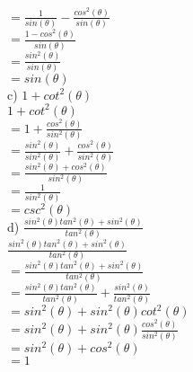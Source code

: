 \begin{enumerate}
{\tab\tab $= \frac{1}{sin(\theta)} - \frac{cos^2(\theta)}{sin(\theta)}$\\

\tab\tab $= \frac{1 - cos^2(\theta)}{sin(\theta)}$\\

\tab\tab $= \frac{sin^2(\theta)}{sin(\theta)}$\\

\tab\tab $= sin(\theta)$\\

\tab c) $1 + cot^2(\theta)$\\

\tab\tab $1 + cot^2(\theta)$\\

\tab\tab $= 1 + \frac{cos^2(\theta)}{sin^2(\theta)}$\\

\tab\tab $= \frac{sin^2(\theta)}{sin^2(\theta)} + \frac{cos^2(\theta)}{sin^2(\theta)}$\\

\tab\tab $= \frac{sin^2(\theta) + cos^2(\theta)}{sin^2(\theta)}$\\

\tab\tab $= \frac{1}{sin^2(\theta)}$\\

\tab\tab $= csc^2(\theta)$\\

\tab d) $\frac{sin^2(\theta)tan^2(\theta) + sin^2(\theta)}{tan^2(\theta)}$\\

\tab\tab $\frac{sin^2(\theta)tan^2(\theta) + sin^2(\theta)}{tan^2(\theta)}$\\

\tab\tab $= \frac{sin^2(\theta)tan^2(\theta) + sin^2(\theta)}{tan^2(\theta)}$\\

\tab\tab $= \frac{sin^2(\theta)tan^2(\theta)}{tan^2(\theta)} + \frac{sin^2(\theta)}{tan^2(\theta)}$\\

\tab\tab $= sin^2(\theta) + sin^2(\theta)cot^2(\theta)$\\

\tab\tab $= sin^2(\theta) + sin^2(\theta)\frac{cos^2(\theta)}{sin^2(\theta)}$\\

\tab\tab $= sin^2(\theta) + cos^2(\theta)$\\

\tab\tab $= 1$\\

}
\end{enumerate}

